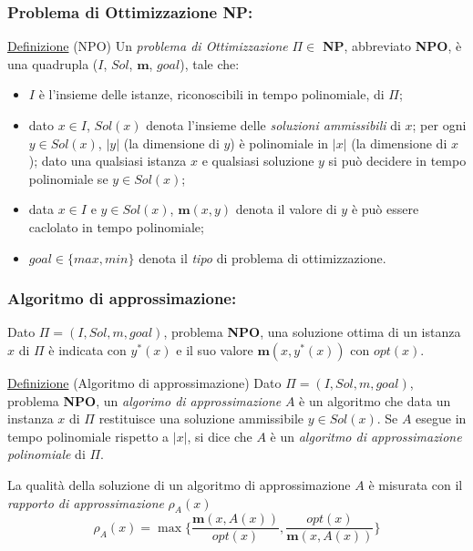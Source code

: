 \documentclass{beamer}
\begin{document}
\begin{frame}
\frametitle{Problema di Ottimizzazione NP:}
    \begin{block}{\underline{Definizione} (NPO)}
        Un \textit{problema di Ottimizzazione} $\Pi \in$ \textbf{NP}, abbreviato \textbf{NPO},  è una quadrupla ($I$, $Sol$, $\textbf{m}$, $goal$), tale che:
        \begin{itemize}
            \item $I$ è l'insieme delle istanze, riconoscibili in tempo polinomiale, di $\Pi$; 
            \item dato $x\in I$, $Sol(x)$ denota l'insieme delle \textit{soluzioni ammissibili} di $x$; per ogni $y \in Sol(x)$, $|y|$ (la dimensione di $y$) è polinomiale in $|x|$ (la dimensione di $x$); dato una qualsiasi istanza $x$ e qualsiasi soluzione $y$ si può decidere in tempo polinomiale se $y \in Sol(x)$;
            \item data $x \in I$ e $y \in Sol(x)$, $\textbf{m}(x, y)$ denota il valore di $y$ è può essere caclolato in tempo polinomiale;
            \item $goal\in\{max, min\}$ denota il \textit{tipo} di problema di ottimizzazione.
        \end{itemize}
    \end{block}

\end{frame}

\begin{frame}
    \frametitle{Algoritmo di approssimazione:}
    
    Dato $\Pi = (I, Sol, m, goal)$, problema \textbf{NPO}, una soluzione ottima di un istanza $x$ di $\Pi$ è indicata con $y^{*}(x)$ e il suo valore $\textbf{m}(x,y^{*}(x))$ con $opt(x)$.
    \vskip 15pt
    \begin{block}{\underline{Definizione} (Algoritmo di approssimazione)}
        Dato $\Pi = (I, Sol, m, goal)$, problema \textbf{NPO}, un \textit{algorimo di approssimazione} $A$ è un algoritmo che data un instanza $x$ di $\Pi$ restituisce una soluzione ammissibile $y \in Sol(x)$. Se $A$  esegue in tempo polinomiale rispetto a $|x|$, si dice che $A$ è un \textit{algoritmo di approssimazione polinomiale} di $\Pi$.
    \end{block}
    \vskip 20pt
    La qualità della soluzione di un algoritmo di approssimazione $A$ è misurata con il \textit{rapporto di approssimazione} $\rho_A(x)$
    $$\rho_A(x) = \max \Bigg \{\frac{\textbf{m}(x, A(x))}{opt(x)}, \frac{opt(x)}{\textbf{m}(x, A(x))} \Bigg\} $$ 
\end{frame}
\end{document}
